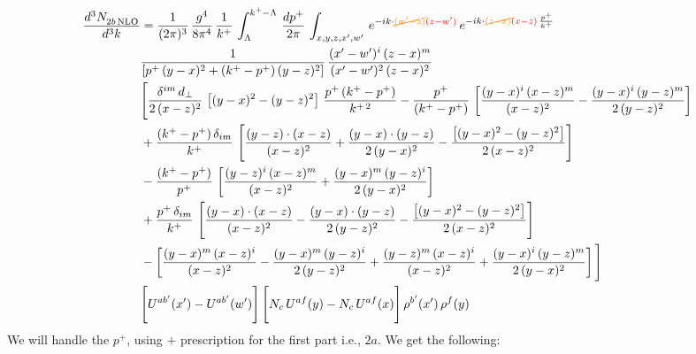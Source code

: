 \documentclass[9pt]{article}
\numberwithin{equation}{section}
\begin{document}
\begin{align}
 \frac{d^{3}N_{2b\,\rm NLO}^{\rm}}{d^{3}k}  & =   \frac{1}{(2\pi)^{3}}\,\frac{g^{4}}{8\pi^{4}}\,\frac{1}{k^{+}}\,\int_{\Lambda}^{k^{+}-\Lambda}\, \frac{dp^{+}}{2\pi} \, \int_{x,y,z,x',w'}\,e^{-ik\cdot{\color{orange}\cancel{(w'-z)}}{\color{red}(z-w')}}\,e^{-ik\cdot {\color{orange}\cancel{(z-x)}}{\color{red}(x-z)}\,\frac{p^{+}}{k^{+}}}\,\notag \\ & \frac{1}{\left[p^{+}\,(y-x)^{2}+(k^{+}-p^{+})\,(y-z)^{2}\right]}\, \frac{(x'-w')^{i}\,(z-x)^{m}}{(x'-w')^{2}\,(z-x)^{2}} \notag \\ & \Bigg[\frac{\delta^{im}\,d_{\perp}}{2\,(x-z)^{2}}\,\left[(y-x)^{2}-(y-z)^{2}\right]\,\frac{p^{+}\,(k^{+}-p^{+})}{k^{+\,2}}-\frac{p^{+}}{(k^{+}-p^{+})}\,\left[\frac{(y-x)^{i}\,(x-z)^{m}}{(x-z)^{2}}-\frac{(y-x)^{i}\,(y-z)^{m}}{2\,(y-z)^{2}}\right]\notag \\ & +\frac{(k^{+}-p^{+})\,\delta_{im}}{k^{+}}\,\left[\frac{(y-z)\cdot (x-z)}{(x-z)^{2}}+\frac{(y-x)\cdot (y-z)}{2\,(y-x)^{2}}-\frac{\left[(y-x)^{2}-(y-z)^{2}\right]}{2\,(x-z)^{2}}\right]\notag \\ & -\frac{(k^{+}-p^{+})}{p^{+}}\,\left[\frac{(y-z)^{i}\,(x-z)^{m}}{(x-z)^{2}}+\frac{(y-x)^{m}\,(y-z)^{i}}{2\,(y-x)^{2}}\right]\notag \\ & +\frac{p^{+}\,\delta_{im}}{k^{+}}\,\left[\frac{(y-x)\cdot (x-z)}{(x-z)^{2}}-\frac{(y-x)\cdot (y-z)}{2\,(y-z)^{2}}-\frac{\left[(y-x)^{2}-(y-z)^{2}\right]}{2\,(x-z)^{2}}\right]\notag \\ &-\left[\frac{(y-x)^{m}\,(x-z)^{i}}{(x-z)^{2}}-\frac{(y-x)^{m}\,(y-z)^{i}}{2\,(y-z)^{2}}+\frac{(y-z)^{m}\,(x-z)^{i}}{(x-z)^{2}}+\frac{(y-x)^{i}\,(y-z)^{m}}{2\,(y-x)^{2}}\right]\Bigg] \notag \\ & \Bigg[U^{ab'}(x')-U^{ab'}(w')\Bigg]\,\Bigg[N_{c}\,U^{af}(y) -N_{c}\,U^{af}(x)\Bigg]\,\rho^{b'}(x')\,\rho^{f}(y)
\end{align}
We will handle the $p^{+}$, using $+$ prescription for the first part i.e., $2a$. We get the following: 
\end{document}
